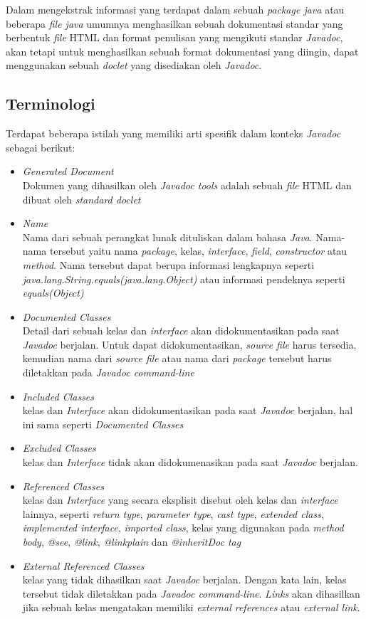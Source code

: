 Dalam mengekstrak informasi yang terdapat dalam sebuah {\it package java} atau beberapa {\it file java} umumnya menghasilkan sebuah dokumentasi standar yang berbentuk {\it file} HTML dan format penulisan yang mengikuti standar {\it Javadoc}, akan tetapi untuk menghasilkan sebuah format dokumentasi yang diingin, dapat menggunakan sebuah {\it doclet} yang disediakan oleh {\it Javadoc}.

\subsection{Terminologi}
\label{sec:terminologi}
Terdapat beberapa istilah yang memiliki arti spesifik dalam konteks {\it Javadoc} sebagai berikut:
\begin{itemize}
	\item {\it Generated Document}\\
	Dokumen yang dihasilkan oleh {\it Javadoc tools} adalah sebuah {\it file} HTML dan dibuat oleh {\it standard doclet}
	\item {\it Name}\\
	Nama dari sebuah perangkat lunak dituliskan dalam bahasa {\it Java}. Nama-nama tersebut yaitu nama {\it package}, kelas, {\it interface}, {\it field}, {\it constructor} atau {\it method}. Nama tersebut dapat berupa informasi lengkapnya seperti {\it java.lang.String.equals(java.lang.Object)} atau informasi pendeknya seperti {\it equals(Object)}
	\item {\it Documented Classes}\\
	Detail dari sebuah kelas dan {\it interface} akan didokumentasikan pada saat {\it Javadoc} berjalan. Untuk dapat didokumentasikan, {\it source file} harus tersedia, kemudian nama dari {\it source file} atau nama dari {\it package} tersebut harus diletakkan pada {\it Javadoc command-line}
	\item {\it Included Classes}\\
	kelas dan {\it Interface} akan didokumentasikan pada saat {\it Javadoc} berjalan, hal ini sama seperti {\it Documented Classes}
	\item {\it Excluded Classes}\\
	kelas dan {\it Interface} tidak akan didokumenasikan pada saat {\it Javadoc} berjalan.
	\item {\it Referenced Classes}\\
	kelas dan {\it Interface} yang secara eksplisit disebut oleh kelas dan {\it interface} lainnya, seperti {\it return type}, {\it parameter type}, {\it cast type}, {\it extended class}, {\it implemented interface}, {\it imported class}, kelas yang digunakan pada {\it method body}, {\it @see}, {\it {@link}}, {\it {@linkplain}} dan {\it {@inheritDoc} tag} 
	\item {\it External Referenced Classes}\\
	kelas yang tidak dihasilkan saat {\it Javadoc} berjalan. Dengan kata lain, kelas tersebut tidak diletakkan pada {\it Javadoc command-line}. {\it Links} akan dihasilkan jika sebuah kelas mengatakan memiliki {\it external references} atau {\it external link}.
\end{itemize}

